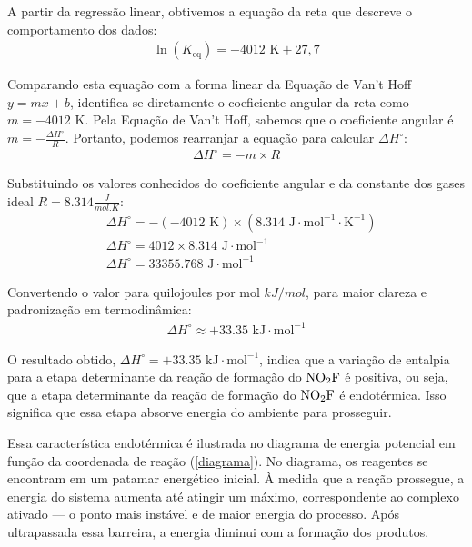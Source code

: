 A partir da regressão linear, obtivemos a equação da reta que descreve o comportamento dos dados:
\begin{align*}
\ln(K_\text{eq}) = -4012 \text{ K} + 27,7
\end{align*}

Comparando esta equação com a forma linear da Equação de Van't Hoff \(y = mx + b\), identifica-se diretamente o coeficiente angular da reta como \(m = -4012 \text{ K}\). Pela Equação de Van't Hoff, sabemos que o coeficiente angular é \(m = -\frac{\Delta H^\circ}{R}\). Portanto, podemos rearranjar a equação para calcular \(\Delta H^\circ\):
\begin{align*}
    \Delta H^\circ = -m \times R
\end{align*}

Substituindo os valores conhecidos do coeficiente angular e da constante dos gases ideal \(R = 8.314 \frac{J}{mol.K}\):
\begin{align*}
& \Delta H^\circ = -(-4012 \text{ K}) \times (8.314 \text{ J} \cdot \text{mol}^{-1} \cdot \text{K}^{-1}) \\
& \Delta H^\circ = 4012 \times 8.314 \text{ J} \cdot \text{mol}^{-1} \\
& \Delta H^\circ = 33355.768 \text{ J} \cdot \text{mol}^{-1}
\end{align*}

Convertendo o valor para quilojoules por mol \(kJ/mol\), para maior clareza e padronização em termodinâmica:
\begin{align*}
    \Delta H^\circ \approx +33.35 \text{ kJ} \cdot \text{mol}^{-1}
\end{align*}

O resultado obtido, $\Delta H^\circ = +33.35 \text{ kJ} \cdot \text{mol}^{-1}$, indica que a variação de entalpia para a etapa determinante da reação de formação do $\ce{NO2F}$ é positiva, ou seja, que a etapa determinante da reação de formação do $\ce{NO2F}$ é endotérmica. Isso significa que essa etapa absorve energia do ambiente para prosseguir.

Essa característica endotérmica é ilustrada no diagrama de energia potencial em função da coordenada de reação (\cref{diagrama}). No diagrama, os reagentes se encontram em um patamar energético inicial. À medida que a reação prossegue, a energia do sistema aumenta até atingir um máximo, correspondente ao complexo ativado — o ponto mais instável e de maior energia do processo. Após ultrapassada essa barreira, a energia diminui com a formação dos produtos.

